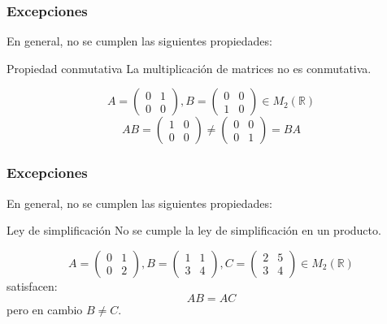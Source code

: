 \documentclass[12pt]{article}
\begin{document}
 
 
       \begin{frame}
  \frametitle{Excepciones}
  En general, \alert<1>{no se cumplen} las siguientes propiedades:
  
   \begin{block}{Propiedad conmutativa}
La multiplicaci\'on de matrices no es conmutativa. 
  \end{block}
\[A = \left(\begin{array}{cc}0 & 1 \\0 & 0\end{array}\right), B = \left(\begin{array}{cc}0 & 0 \\1 & 0\end{array}\right) \in M_2(\mathbb{R}) \]
\[AB = \left(\begin{array}{cc}1 & 0 \\0 & 0 \end{array}\right) \neq \left(\begin{array}{cc}0 & 0 \\0 & 1\end{array}\right) = BA\]
 \end{frame} 
 
        \begin{frame}
  \frametitle{Excepciones}
  En general, \alert<1>{no se cumplen} las siguientes propiedades:
  
   \begin{block}{Ley de simplificaci\'on}
No se cumple la ley de simplificaci\'on en un producto. 
 \end{block}
\[A = \left(\begin{array}{cc}0 & 1 \\0 & 2\end{array}\right), B = \left(\begin{array}{cc}1 & 1 \\3 & 4\end{array}\right), C = \left(\begin{array}{cc}2 & 5 \\3 & 4\end{array}\right)  \in M_2(\mathbb{R}) \]
satisfacen:
\[AB = AC\]
pero en cambio $B\neq C$.
 \end{frame} 
 
\end{document}
